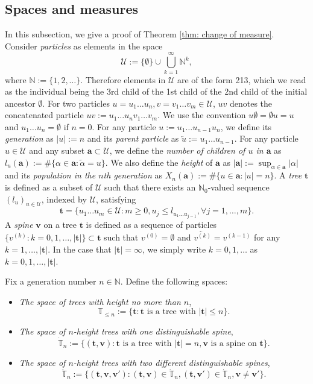 \documentclass[ECP]{ejpecp} %
\begin{document}
\subsection{Spaces and measures}
\label{sec:spacesandmeasures}
In this subsection, we give a proof of Theorem \ref{thm: change of measure}.
Consider \emph{particles} as elements in the space
\[
\mathcal U
:=
\{\emptyset\}\cup\bigcup_{k=1}^\infty \mathbb N^k,
\]
where $\mathbb N:=\{1,2,\dots\}$.
Therefore elements in $\mathcal U$ are of the form 213, which we read as the individual being the 3rd child of the 1st child of the 2nd child of the initial ancestor $\emptyset$.
For two particles $u=u_1\dots u_n, v=v_1\dots v_m\in\mathcal U$, $uv$ denotes the concatenated particle $uv:=u_1\dots u_nv_1\dots v_m$.
We use the convention $u\emptyset = \emptyset u = u$ and $u_1\dots u_n=\emptyset$ if $n=0$.
For any particle $u:=u_1\dots u_{n-1}u_n$, we define its \emph{generation} as $| u |:=n$ and its \emph{parent particle} as $\overleftarrow{u}:=u_1\dots u_{n-1}$.
For any particle $u \in \mathcal U$ and any subset $\mathbf a \subset \mathcal U$, we define the \emph{number of children of $u$ in $\mathbf a$} as $l_u(\mathbf a) := \#\{\alpha\in \mathbf a:\overleftarrow{\alpha}=u\} $.
We also define the \emph{height} of $\mathbf a$ as $|\mathbf a|:=\sup_{\alpha\in \mathbf a}|\alpha|$ and its \emph{population in the $n$th generation} as $X_n(\mathbf a):=\#\{u\in \mathbf a:|u|=n\}$.
A \emph{tree} $ \mathbf t $ is defined as a subset of $\mathcal U$ such that there exists an $\mathbb N_0$-valued sequence $(l_u)_{u\in \mathcal U}$,
indexed by $\mathcal U$, satisfying
\[
\mathbf t
=\{u_1\dots u_m\in \mathcal U: m\ge 0, u_j\leq l_{u_1\dots u_{j-1}}, \forall  j=1,\dots,m\}.
\]
A \emph{spine} $ \mathbf v$ on a  tree $ \mathbf t $ is defined as a sequence of particles $\{v^{(k)}:k=0,1,\dots,| \mathbf t |\}\subset \mathbf t $ such that $v^{(0)}=\emptyset$ and $\overleftarrow{v^{(k)}}=v^{(k-1)}$ for any $k=1,\dots, | \mathbf t |$.
In the case that $| \mathbf t |=\infty$, we simply write $k=0,1,\dots$ as $k=0,1,\dots, | \mathbf t |$.

Fix a generation number $n\in \mathbb N$. Define the following spaces:
\begin{itemize}
	\item
	\emph{The space of trees with height no more than $n$},
	\[
	\mathbb T_{\leq n}
	:=\{ \mathbf t : \mathbf t \text{ is a tree with }| \mathbf t | \leq n\}.
	\]
	\item
	\emph {The space of $n$-height trees with one distinguishable spine},
	\[
	\dot{\mathbb T}_n
	:=\{( \mathbf t , \mathbf v): \mathbf t  \text{ is a tree with } | \mathbf t |=n,  \mathbf v \text{ is a spine on }  \mathbf t \}.
	\]
	\item
	\emph{The space of $n$-height trees with two different distinguishable spines},
	\[
	\ddot{\mathbb T}_n
	:=\{( \mathbf t , \mathbf v, \mathbf v'):( \mathbf t , \mathbf v)\in\dot{\mathbb T}_n,( \mathbf t , \mathbf v')\in\dot{\mathbb T}_n, \mathbf v\neq \mathbf v'\}.
	\]
\end{itemize}
\end{document}
